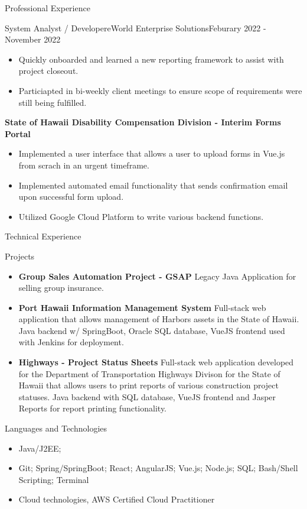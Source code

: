 \documentclass[]{mcdowellcv}
\begin{document}
\begin{cvsection}{Professional Experience}
\begin{cvsubsection}{System Analyst / Developer}{eWorld Enterprise Solutions}{Feburary 2022 - November 2022}
\begin{itemize}
				\item Quickly onboarded and learned a new reporting framework to assist with project closeout.
				\item Particiapted in bi-weekly client meetings to ensure scope of requirements were still being fulfilled. 
			\end{itemize}
			\textbf{State of Hawaii Disability Compensation Division - Interim Forms Portal}
			\begin{itemize}
				\item Implemented a user interface that allows a user to upload forms in Vue.js from scrach in an urgent timeframe.
				\item Implemented automated email functionality that sends confirmation email upon successful form upload.
				\item Utilized Google Cloud Platform to write various backend functions.
			\end{itemize}
		\end{cvsubsection}
	\end{cvsection}
		
	\begin{cvsection}{Technical Experience}
		\begin{cvsubsection}{Projects}{}{}
			\begin{itemize}
				\item \textbf{Group Sales Automation Project - GSAP} Legacy Java Application for selling group insurance.
				\item \textbf{Port Hawaii Information Management System} Full-stack web application that allows management of Harbors assets in the State of Hawaii. Java backend w/ SpringBoot, Oracle SQL database, VueJS frontend used with Jenkins for deployment.
				\item \textbf{Highways - Project Status Sheets} Full-stack web application developed for the Department of Transportation Highways Divison for the State of Hawaii that allows users to print reports of various construction project statuses. Java backend with SQL database, VueJS frontend and Jasper Reports for report printing functionality.
			\end{itemize}
		\end{cvsubsection}
	\end{cvsection}
	
	\begin{cvsection}{Languages and Technologies}
		\begin{cvsubsection}{}{}{}	
			\begin{itemize}
				\item Java/J2EE; 
				\item Git; Spring/SpringBoot; React; AngularJS; Vue.js; Node.js; SQL; Bash/Shell Scripting; Terminal
				\item Cloud technologies, AWS Certified Cloud Practitioner
			\end{itemize}
		\end{cvsubsection}
	\end{cvsection}
\end{document}
